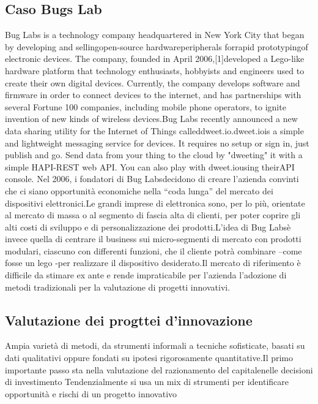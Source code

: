 \documentclass{article}
\begin{document}
\subsection{Caso Bugs Lab}
Bug Labs is a technology company headquartered in New York City that began by developing and sellingopen-source hardwareperipherals forrapid prototypingof electronic devices. The company, founded in April 2006,[1]developed a Lego-like hardware platform that technology enthusiasts, hobbyists and engineers used to create their own digital devices. Currently, the company develops software and firmware in order to connect devices to the internet, and has partnerships with several Fortune 100 companies, including mobile phone operators, to ignite invention of new kinds of wireless devices.Bug Labs recently announced a new data sharing utility for the Internet of Things calleddweet.io.dweet.iois a simple and lightweight messaging service for devices. It requires no setup or sign in, just publish and go. Send data from your thing to the cloud by "dweeting" it with a simple HAPI-REST web API. You can also play with dweet.iousing theirAPI console.
Nel 2006, i fondatori di Bug Labsdecidono di creare l’azienda convinti che ci siano opportunità economiche nella “coda lunga” del mercato dei dispositivi elettronici.Le grandi imprese di elettronica sono, per lo più, orientate al mercato di massa o al segmento di fascia alta di clienti, per poter coprire gli alti costi di sviluppo e di personalizzazione dei prodotti.L’idea di Bug Labsè invece quella di centrare il business sui micro-segmenti di mercato con prodotti modulari, ciascuno con differenti funzioni, che il cliente potrà combinare –come fosse un lego -per realizzare il dispositivo desiderato.Il mercato di riferimento è difficile da stimare ex ante e rende impraticabile per l’azienda l’adozione di metodi tradizionali per la valutazione di progetti innovativi.


\subsection{Valutazione dei progttei d'innovazione}
Ampia varietà di metodi, da strumenti informali a tecniche sofisticate, basati su dati qualitativi oppure fondati su ipotesi rigorosamente quantitative.Il primo importante passo sta nella valutazione del razionamento del capitalenelle decisioni di investimento Tendenzialmente si usa un mix di strumenti per identificare opportunità e rischi di un progetto innovativo
\end{document}
